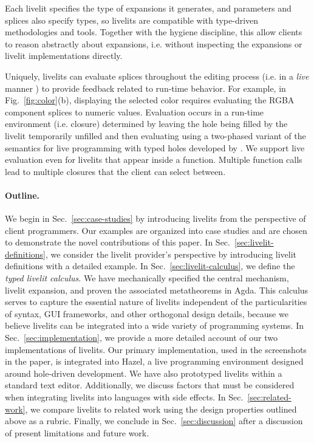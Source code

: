  Each livelit specifies the type of expansions it generates, 
and parameters and splices also specify types, 
so livelits are compatible with type-driven methodologies and tools.
Together with the hygiene discipline, this allow clients to reason abstractly about expansions, i.e.  
without inspecting the expansions or livelit implementations directly.

 Uniquely, livelits can evaluate splices 
  throughout the editing process 
  (i.e. in a \emph{live} manner \cite{DBLP:conf/icse/Tanimoto13}) 
  to provide feedback related to run-time behavior.
  For example, in Fig.~\ref{fig:color}(b), 
  displaying the selected color requires evaluating the RGBA
  component splices to numeric values.
  Evaluation occurs in a run-time environment (i.e. closure) determined by
  leaving the hole being filled by the livelit temporarily unfilled and then evaluating
  using a two-phased variant of the semantics for 
  live programming with typed holes developed by \citet{HazelnutLive}.
  We support live evaluation even for livelits 
  that appear inside a function. Multiple function calls lead 
  to multiple closures that the client 
   can select between.

\paragraph{Outline.} We begin in Sec.~\ref{sec:case-studies} by introducing
livelits from the perspective of client programmers. 
Our examples are organized into case studies 
and are chosen to demonstrate the novel contributions of this paper.
In Sec.~\ref{sec:livelit-definitions}, 
we consider the livelit provider's perspective by introducing livelit
definitions with a detailed example.
In Sec.~\ref{sec:livelit-calculus}, we define the \emph{typed livelit calculus}. 
We have mechanically specified the central mechanism, livelit expansion, and proven the associated metatheorems in Agda.
This calculus 
serves to capture the essential nature of livelits 
independent of the particularities of syntax, GUI frameworks, 
and other orthogonal design details,
because we believe livelits can be integrated into a wide variety of programming systems. 
In Sec.~\ref{sec:implementation}, we provide a more detailed account of our two implementations of livelits.
Our primary implementation, used in the screenshots in the paper,
is integrated into Hazel, a live programming environment designed 
around hole-driven development. 
We have also prototyped livelits within a standard text editor. 
Additionally, we discuss factors that must be considered when integrating livelits into languages with side effects.
In Sec.~\ref{sec:related-work}, we compare livelits to related work using the design properties outlined above 
as a rubric.
Finally, we conclude in Sec.~\ref{sec:discussion} after a discussion of present limitations and future work.